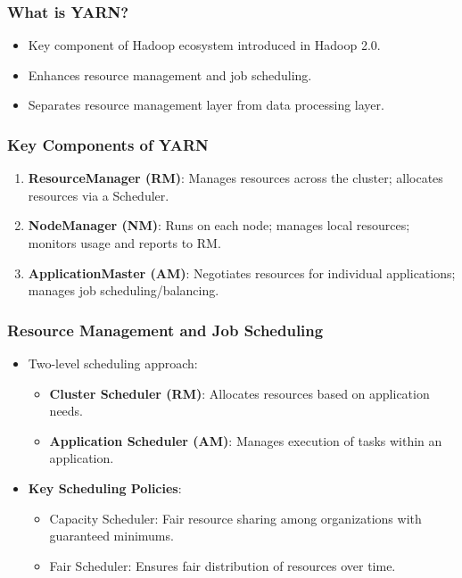\documentclass[aspectratio=169]{beamer}
\begin{document}
\begin{frame}[fragile]
    \frametitle{What is YARN?}
    \begin{itemize}
        \item Key component of Hadoop ecosystem introduced in Hadoop 2.0.
        \item Enhances resource management and job scheduling.
        \item Separates resource management layer from data processing layer.
    \end{itemize}
\end{frame}

\begin{frame}[fragile]
    \frametitle{Key Components of YARN}
    \begin{enumerate}
        \item \textbf{ResourceManager (RM)}: Manages resources across the cluster; allocates resources via a Scheduler.
        \item \textbf{NodeManager (NM)}: Runs on each node; manages local resources; monitors usage and reports to RM.
        \item \textbf{ApplicationMaster (AM)}: Negotiates resources for individual applications; manages job scheduling/balancing.
    \end{enumerate}
\end{frame}

\begin{frame}[fragile]
    \frametitle{Resource Management and Job Scheduling}
    \begin{itemize}
        \item Two-level scheduling approach:
        \begin{itemize}
            \item \textbf{Cluster Scheduler (RM)}: Allocates resources based on application needs.
            \item \textbf{Application Scheduler (AM)}: Manages execution of tasks within an application.
        \end{itemize}
        \item \textbf{Key Scheduling Policies}:
        \begin{itemize}
            \item Capacity Scheduler: Fair resource sharing among organizations with guaranteed minimums.
            \item Fair Scheduler: Ensures fair distribution of resources over time.
        \end{itemize}
    \end{itemize}
\end{frame}
\end{document}
